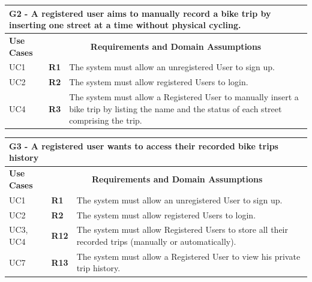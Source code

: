 \vspace{0.6cm}

\begin{longtable}{|p{2.5cm}|p{1cm}|p{10.5cm}|}
\hline
\multicolumn{3}{|p{14.5cm}|}{\centering \textbf{G2 - A registered user aims to manually record a bike trip by inserting one street at a time without physical cycling.}} \\
\hline
\textbf{Use Cases} & \multicolumn{2}{c|}{\textbf{Requirements and Domain Assumptions}} \\
\hline
UC1 & \textbf{R1} & The system must allow an unregistered User to sign up. \\
\hline
UC2 & \textbf{R2} & The system must allow registered Users to login. \\
\hline
UC4 & \textbf{R3} & The system must allow a Registered User to manually insert a bike trip by listing the name and the status of each street comprising the trip. \\
\hline
\end{longtable}

\vspace{0.5cm}

\begin{longtable}{|p{2.5cm}|p{1cm}|p{10.5cm}|}
\hline
\multicolumn{3}{|p{14.5cm}|}{\centering \textbf{G3 - A registered user wants to access their recorded bike trips history}} \\
\hline
\textbf{Use Cases} & \multicolumn{2}{c|}{\textbf{Requirements and Domain Assumptions}} \\
\hline
UC1 & \textbf{R1} & The system must allow an unregistered User to sign up. \\
\hline
UC2 & \textbf{R2} & The system must allow registered Users to login. \\
\hline
UC3, UC4 & \textbf{R12} & The system must allow Registered Users to store all their recorded trips (manually or automatically). \\
\hline
UC7 & \textbf{R13} & The system must allow a Registered User to view his private trip history. \\
\hline
\end{longtable}

\vspace{0.5cm}

